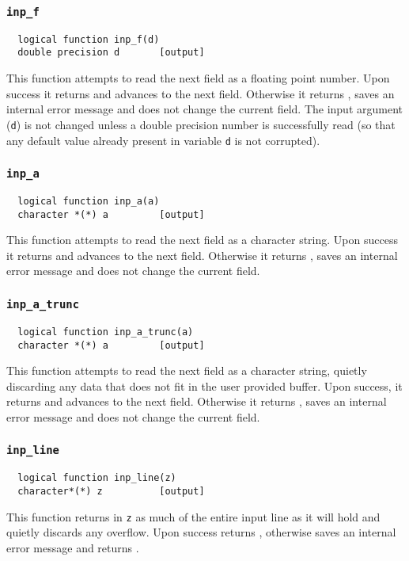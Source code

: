 \subsubsection{{\tt inp\_f}}
\begin{verbatim}
  logical function inp_f(d)
  double precision d       [output]
\end{verbatim}
This function attempts to read the next field as a floating point number.  Upon
success it returns \TRUE and advances to the next field.  Otherwise it
returns \FALSE, saves an internal error message and does not change
the current field.  The input argument ({\tt d}) is not changed unless
a double precision number is successfully read (so that any default value already
present in variable {\tt d} is not corrupted).

\subsubsection{{\tt inp\_a}}
\begin{verbatim}
  logical function inp_a(a)
  character *(*) a         [output]
\end{verbatim}
This function attempts to read the next field as a character string.  Upon success
it returns \TRUE and advances to the next field.  Otherwise it returns
\FALSE, saves an internal error message and does not change the
current field.

\subsubsection{{\tt inp\_a\_trunc}}
\begin{verbatim}
  logical function inp_a_trunc(a)
  character *(*) a         [output]
\end{verbatim}
This function attempts to read the next field as a character string, quietly
discarding any data that does not fit in the user provided buffer.
Upon success, it returns \TRUE and advances to the next field.
Otherwise it returns \FALSE, saves an internal error message and does
not change the current field.

\subsubsection{{\tt inp\_line}}
\begin{verbatim}
  logical function inp_line(z)
  character*(*) z          [output]
\end{verbatim}
This function returns in {\tt z} as much of the entire input line as it will hold and
quietly discards any overflow.  Upon success returns \TRUE,
otherwise saves an internal error message and returns \FALSE.

